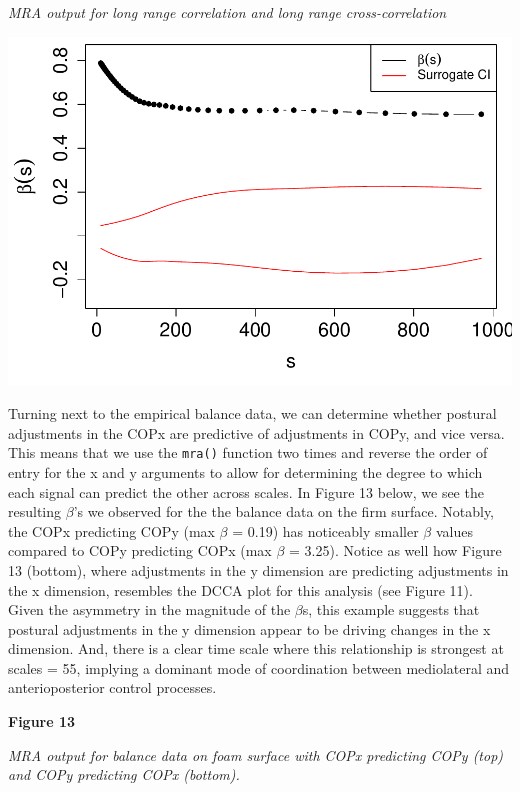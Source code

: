 \documentclass[
  man]{apa6}
\begin{document}
\emph{MRA output for long range correlation and long range cross-correlation}

\includegraphics{fractal_regression_paper_brm_files/figure-latex/unnamed-chunk-24-1.pdf}

Turning next to the empirical balance data, we can determine whether
postural adjustments in the COPx are predictive of adjustments in COPy,
and vice versa. This means that we use the \texttt{mra()} function two times
and reverse the order of entry for the x and y arguments to allow for
determining the degree to which each signal can predict the other across
scales. In Figure 13 below, we see the resulting \(\beta\)'s we observed
for the the balance data on the firm surface. Notably, the COPx
predicting COPy (max \(\beta\) = 0.19) has
noticeably smaller \(\beta\) values compared to COPy predicting COPx (max
\(\beta\) = 3.25). Notice as well how Figure 13
(bottom), where adjustments in the y dimension are predicting
adjustments in the x dimension, resembles the DCCA plot for this
analysis (see Figure 11). Given the asymmetry in the magnitude of the
\(\beta\)s, this example suggests that postural adjustments in the y
dimension appear to be driving changes in the x dimension. And, there is
a clear time scale where this relationship is strongest at scales =
55, implying a
dominant mode of coordination between mediolateral and anterioposterior
control processes.

\textbf{Figure 13}

\emph{MRA output for balance data on foam surface with COPx predicting COPy
(top) and COPy predicting COPx (bottom).}
\end{document}

